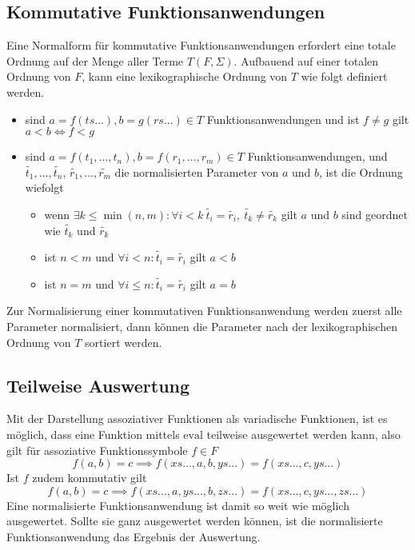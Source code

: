 \documentclass{article}
\begin{document}
\subsection{Kommutative Funktionsanwendungen}
Eine Normalform für kommutative Funktionsanwendungen erfordert eine totale Ordnung auf der Menge aller Terme $T(F, \Sigma)$. Aufbauend auf einer totalen Ordnung von $F$, kann eine lexikographische Ordnung von $T$ wie folgt definiert werden. 
\begin{itemize}
	\item{sind $a = f(ts...), b = g(rs...) \in T$ Funktionsanwendungen und ist $f \neq g$ gilt $a < b \iff f < g $}
	\item{sind $a = f(t_1, \dots, t_n), b = f(r_1, \dots, r_m) \in T$ Funktionsanwendungen, und $\tilde{t_1}, \dots, \tilde{t_n}$, $\tilde{r_1}, \dots, \tilde{r_m}$ die normalisierten Parameter von $a$ und $b$, ist die Ordnung wiefolgt}
	\begin{itemize}
		\item{wenn $\exists k \leq \min{(n, m)} \colon \forall i < k ~ \tilde{t_i} = \tilde{r_i} ,~ \tilde{t_k} \neq \tilde{r_k} $ gilt $a$ und $b$ sind geordnet wie $\tilde{t_k}$ und $\tilde{r_k}$}
		\item{ist $n < m$ und $\forall i < n\colon \tilde{t_i} = \tilde{r_i}$ gilt $a < b$}
		\item{ist $n = m$ und $\forall i \leq n\colon \tilde{t_i} = \tilde{r_i}$ gilt $a = b$}
	\end{itemize}
\end{itemize}
Zur Normalisierung einer kommutativen Funktionsanwendung werden zuerst alle Parameter normalisiert, dann können die Parameter nach der lexikographischen Ordnung von $T$ sortiert werden.

\subsection{Teilweise Auswertung}
Mit der Darstellung assoziativer Funktionen als variadische Funktionen, ist es möglich, dass eine Funktion mittels $\mathrm{eval}$ teilweise ausgewertet werden kann, also gilt für assoziative Funktionssymbole $f \in F$
$$f(a, b) = c \implies f(xs..., a, b, ys...) = f(xs..., c, ys...)$$
Ist $f$ zudem kommutativ gilt 
$$f(a, b) = c \implies f(xs..., a, ys..., b, zs...) = f(xs..., c, ys..., zs...)$$
Eine normalisierte Funktionsanwendung ist damit so weit wie möglich ausgewertet. Sollte sie ganz ausgewertet werden können, ist die normalisierte Funktionsanwendung das Ergebnis der Auswertung.
\end{document}
